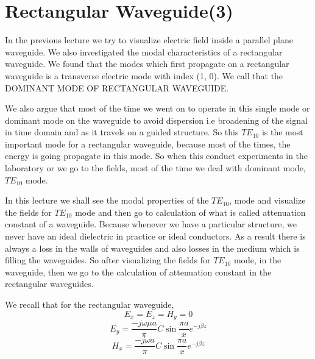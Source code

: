 \chapter{Rectangular Waveguide(3)}



	In the previous lecture we try to visualize electric field inside a parallel plane waveguide. We also investigated the modal characteristics of a rectangular waveguide. We found that the modes which first propagate on a rectangular waveguide is a transverse electric mode with index (1, 0). We call that the DOMINANT MODE OF RECTANGULAR WAVEGUIDE. \newline
		
	We also argue that most of the time we went on to operate in this single mode or dominant mode on the waveguide to avoid dispersion i.e broadening of the signal in time domain and as it travels on a guided structure. So this $TE_{10}$  is the most important mode for a rectangular waveguide, because most of the times, the energy is going propagate in this mode. So when this conduct experiments in the laboratory or we go to the fields, most of the time we deal with dominant mode,  $TE_{10}$ mode. \newline

	
	In this lecture we shall see the modal properties of the $TE_{10}$, mode and visualize the fields for $TE_{10}$ mode and then go to  calculation of what is called attenuation constant of  a waveguide. Because whenever we have a particular structure, we never have an
	ideal dielectric in practice or ideal conductors. As a result there is always a loss in the walls of waveguides and also losses in the medium which is filling the waveguides.
	So after visualizing the fields for $TE_{10}$ mode, in the waveguide, then we go to the calculation of attenuation constant in the rectangular waveguides.\newline
		
	We recall that for the rectangular waveguide,
\begin{equation}
	E_{x} = E_{z} = H_{y} = 0
\end{equation}	
\begin{equation}
	E_{y} = \dfrac{-j\omega\mu a }{\pi} C\sin \dfrac{\pi a}{x} e ^{-j\beta z}
\end{equation}
\begin{equation}
	H_{x} = \dfrac{-j\omega a}{\pi} C \sin\dfrac{\pi a}{x}
		e^{-j\beta z} 
\end{equation}

